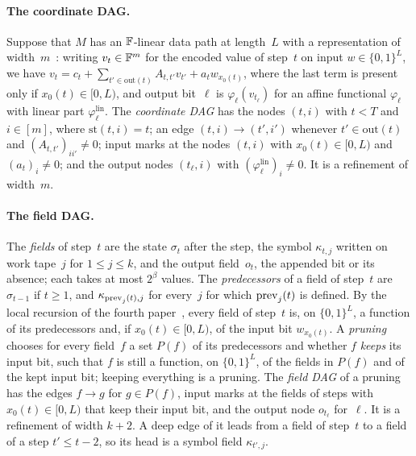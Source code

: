 \paragraph{The coordinate DAG.} Suppose that $M$ has an $\mathbb{F}$-linear data path at length~$L$ with a representation of
width~$m$~\cite[Definition~7.1]{BoundedNesting2026}: writing $v_t\in\mathbb{F}^m$ for the encoded value of step~$t$ on input
$w\in\{0,1\}^L$, we have $v_t=c_t+\sum_{t'\in\mathrm{out}(t)}A_{t,t'}v_{t'}+a_tw_{x_0(t)}$, where the last term is
present only if $x_0(t)\in[0,L)$, and output bit~$\ell$ is $\varphi_\ell(v_{t_\ell})$ for an affine functional
$\varphi_\ell$ with linear part $\varphi_\ell^{\mathrm{lin}}$. The \emph{coordinate DAG} has the nodes $(t,i)$ with
$t<T$ and $i\in[m]$, where $\mathrm{st}(t,i)=t$; an edge $(t,i)\to(t',i')$ whenever $t'\in\mathrm{out}(t)$ and
$(A_{t,t'})_{ii'}\ne0$; input marks at the nodes $(t,i)$ with $x_0(t)\in[0,L)$ and $(a_t)_i\ne0$; and the output nodes
$(t_\ell,i)$ with $(\varphi^{\mathrm{lin}}_\ell)_i\ne0$. It is a refinement of width~$m$.

\paragraph{The field DAG.} The \emph{fields} of step~$t$ are the state $\sigma_t$ after the step, the symbol
$\kappa_{t,j}$ written on work tape~$j$ for $1\le j\le k$, and the output field~$o_t$, the appended bit or its absence;
each takes at most $2^\beta$ values. The \emph{predecessors} of a field of step~$t$ are $\sigma_{t-1}$ if $t\ge1$, and
$\kappa_{\mathrm{prev}_j(t),j}$ for every~$j$ for which $\mathrm{prev}_j(t)$ is defined. By the local recursion of the fourth
paper~\cite[Lemma~4.2 and its proof]{FourthPaper2026}, every field of step~$t$ is, on $\{0,1\}^L$, a function of its
predecessors and, if $x_0(t)\in[0,L)$, of the input bit $w_{x_0(t)}$. A \emph{pruning} chooses for every field~$f$ a
set $P(f)$ of its predecessors and whether $f$ \emph{keeps} its input bit, such that $f$ is still a function, on
$\{0,1\}^L$, of the fields in $P(f)$ and of the kept input bit; keeping everything is a pruning. The \emph{field DAG} of
a pruning has the edges $f\to g$ for $g\in P(f)$, input marks at the fields of steps with $x_0(t)\in[0,L)$ that keep their
input bit, and the output node $o_{t_\ell}$ for~$\ell$. It is a refinement of width $k+2$. A deep edge of it leads from a
field of step~$t$ to a field of a step $t'\le t-2$, so its head is a symbol field $\kappa_{t',j}$.

